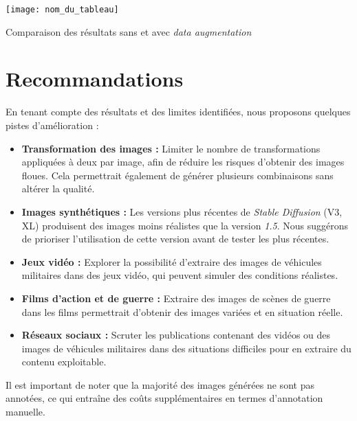 \begin{table}[H]
    \centering
    \texttt{[image: nom\_du\_tableau]}
    \caption{Comparaison des résultats sans et avec \textit{data augmentation}}
    \label{tab:comparaison_aug}
\end{table}

\section{Recommandations}

En tenant compte des résultats et des limites identifiées, nous proposons quelques pistes d'amélioration :

\begin{itemize}
    \item \textbf{Transformation des images :} Limiter le nombre de transformations appliquées à deux par image, afin de réduire les risques d'obtenir des images floues. Cela permettrait également de générer plusieurs combinaisons sans altérer la qualité.
   
    \item \textbf{Images synthétiques :} Les versions plus récentes de \textit{Stable Diffusion} (V3, XL) produisent des images moins réalistes que la version \textit{1.5}. Nous suggérons de prioriser l'utilisation de cette version avant de tester les plus récentes.

    \item \textbf{Jeux vidéo :} Explorer la possibilité d'extraire des images de véhicules militaires dans des jeux vidéo, qui peuvent simuler des conditions réalistes.

    \item \textbf{Films d'action et de guerre :} Extraire des images de scènes de guerre dans les films permettrait d'obtenir des images variées et en situation réelle.

    \item \textbf{Réseaux sociaux :} Scruter les publications contenant des vidéos ou des images de véhicules militaires dans des situations difficiles pour en extraire du contenu exploitable.
\end{itemize}

Il est important de noter que la majorité des images générées ne sont pas annotées, ce qui entraîne des coûts supplémentaires en termes d'annotation manuelle.
